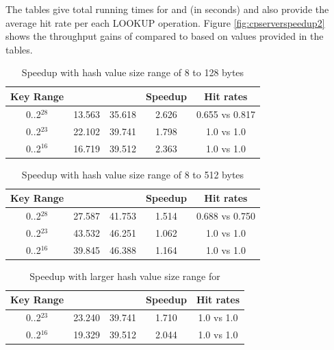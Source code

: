 The tables give total running times for \cpserver{} and \memcached{} (in seconds) and also provide the average hit rate per each LOOKUP operation.
Figure \ref{fig:cpserverspeedup2} shows the throughput gains of \cpserver{} compared to \memcached{} based on values provided in the tables. 

\begin{table}[!ht]
\centering
\begin{tabular}{ | c | c | c | c | c | }
  \hline
  Key Range & \cpserver{} & \memcached{} & Speedup & Hit rates \\
  \hline
  0..2$^{28}$ & 13.563 & 35.618 & 2.626 & 0.655 vs 0.817 \\
  0..2$^{23}$ & 22.102 & 39.741 & 1.798 & 1.0 vs 1.0     \\
  0..2$^{16}$ & 16.719 & 39.512 & 2.363 & 1.0 vs 1.0     \\
  \hline
\end{tabular}
\caption{Speedup with hash value size range of 8 to 128 bytes} 
\label{table:memcachedspeedup0}
\end{table}

\begin{table}[!ht]
\centering
\begin{tabular}{ | c | c | c | c | c | }
  \hline
  Key Range & \cpserver{} & \memcached{} & Speedup & Hit rates \\
  \hline
  0..2$^{28}$ & 27.587 & 41.753 & 1.514 & 0.688 vs 0.750 \\
  0..2$^{23}$ & 43.532 & 46.251 & 1.062 & 1.0 vs 1.0     \\
  0..2$^{16}$ & 39.845 & 46.388 & 1.164 & 1.0 vs 1.0     \\
  \hline
\end{tabular}
\caption{Speedup with hash value size range of 8 to 512 bytes} 
\label{table:memcachedspeedup1}
\end{table}

\begin{table}[!ht]
\centering
\begin{tabular}{ | c | c | c | c | c | }
  \hline
  Key Range & \cpserver{} & \memcached{} & Speedup & Hit rates \\
  \hline
  0..2$^{23}$ & 23.240 & 39.741 & 1.710 & 1.0 vs 1.0   \\
  0..2$^{16}$ & 19.329 & 39.512 & 2.044 & 1.0 vs 1.0   \\
  \hline
\end{tabular}
\caption{Speedup with larger hash value size range for \cpserver{}} 
\label{table:memcachedspeedup2}
\end{table}

